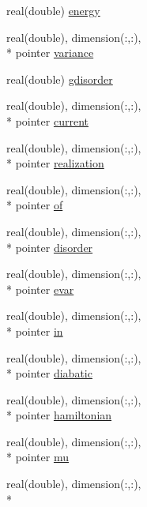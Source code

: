 \begin{DoxyCompactItemize}
\item 
real(double) \hyperlink{structdipoles__class_1_1dipoles_ac0229d4af6218531a78c4890b752a1e7}{energy}
\item 
real(double), dimension(\-:,\-:), \\*
pointer \hyperlink{structdipoles__class_1_1dipoles_afd272228e55cd38a7215e18d5e4008c0}{variance}
\item 
real(double) \hyperlink{structdipoles__class_1_1dipoles_a56a67d756e3344283660da0e91aefa93}{gdisorder}
\item 
real(double), dimension(\-:,\-:), \\*
pointer \hyperlink{structdipoles__class_1_1dipoles_a1f7d8ab8bd71a85a74e56b5461023742}{current}
\item 
real(double), dimension(\-:,\-:), \\*
pointer \hyperlink{structdipoles__class_1_1dipoles_a9f2ebcd22fb84b6121f41bb4b8935273}{realization}
\item 
real(double), dimension(\-:,\-:), \\*
pointer \hyperlink{structdipoles__class_1_1dipoles_ab0c3afd0f8e4b8c3a1ee521a7b96aefb}{of}
\item 
real(double), dimension(\-:,\-:), \\*
pointer \hyperlink{structdipoles__class_1_1dipoles_aa815bc50fc42d986bbb65c421adad3e1}{disorder}
\item 
real(double), dimension(\-:,\-:), \\*
pointer \hyperlink{structdipoles__class_1_1dipoles_a0ad9c6f181edabc7af6eb360edf07c63}{evar}
\item 
real(double), dimension(\-:,\-:), \\*
pointer \hyperlink{structdipoles__class_1_1dipoles_a72b5bb78d64f180123c27dd5cd9434fc}{in}
\item 
real(double), dimension(\-:,\-:), \\*
pointer \hyperlink{structdipoles__class_1_1dipoles_acb589f5c8c60337abc5da4b268ccd0e8}{diabatic}
\item 
real(double), dimension(\-:,\-:), \\*
pointer \hyperlink{structdipoles__class_1_1dipoles_adea6f688f172d2fc865a882326ab36e9}{hamiltonian}
\item 
real(double), dimension(\-:,\-:), \\*
pointer \hyperlink{structdipoles__class_1_1dipoles_a0112209fe626d20d6ef77facd97b5ad8}{mu}
\item 
real(double), dimension(\-:,\-:), \\*

\end{DoxyCompactItemize}
